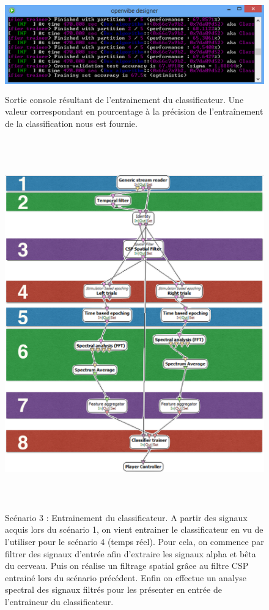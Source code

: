 \begin{figure}[h]
	\centering\includegraphics[height=4cm]{images/consoleClassifier.png}
	\caption[Sortie console résultant de l'entrainement du classificateur.]{Sortie console résultant de l'entrainement du classificateur. Une valeur correspondant en pourcentage à la précision de l'entraînement de la classification nous est fournie.}
	\label{consoleClassifier}
\end{figure}

\begin{figure}[h]
	\centering\includegraphics[height=16cm]{images/scenario3.png}
	\caption[Scénario 3 : Entrainement du classificateur]{Scénario 3 : Entrainement du classificateur. A partir des signaux acquis lors du scénario 1, on vient entrainer le classificateur en vu de l'utiliser pour le scénario 4 (temps réel). Pour cela, on commence par filtrer des signaux d'entrée afin d'extraire les signaux alpha et bêta du cerveau. Puis on réalise un filtrage spatial grâce au filtre CSP entrainé lors du scénario précédent. Enfin on effectue un analyse spectral des signaux filtrés pour les présenter en entrée de l'entraineur du classificateur.}
	\label{scena3}
\end{figure}








